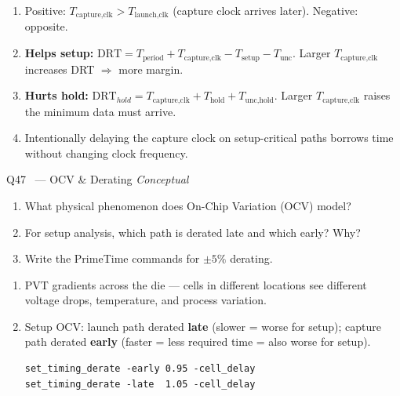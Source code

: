 \documentclass[12pt,a4paper]{article}
\newcommand{\advanced}{%
  \fbox{\textcolor{advred}{\bfseries\sffamily\small ADVANCED}}}
\begin{document}
\begin{answerbox}
\begin{enumerate}[label=\textbf{\alph*)}]
  \item Positive: $T_{\text{capture,clk}} > T_{\text{launch,clk}}$ (capture clock arrives later). Negative: opposite.
  \item \textbf{Helps setup:} $\text{DRT} = T_{\text{period}} + T_{\text{capture,clk}} - T_{\text{setup}} - T_{\text{unc}}$. Larger $T_{\text{capture,clk}}$ increases DRT $\Rightarrow$ more margin.
  \item \textbf{Hurts hold:} $\text{DRT}_{hold} = T_{\text{capture,clk}} + T_{\text{hold}} + T_{\text{unc,hold}}$. Larger $T_{\text{capture,clk}}$ raises the minimum data must arrive.
  \item Intentionally delaying the capture clock on setup-critical paths borrows time without changing clock frequency.
\end{enumerate}
\end{answerbox}

\begin{questionbox}{Q47 \advanced\ --- OCV \& Derating \hfill\textit{Conceptual}}
\begin{enumerate}[label=\textbf{\alph*)}]
  \item What physical phenomenon does On-Chip Variation (OCV) model?
  \item For setup analysis, which path is derated late and which early? Why?
  \item Write the PrimeTime commands for $\pm5\%$ derating.
\end{enumerate}
\end{questionbox}

\begin{answerbox}
\begin{enumerate}[label=\textbf{\alph*)}]
  \item PVT gradients across the die --- cells in different locations see different voltage drops, temperature, and process variation.
  \item Setup OCV: launch path derated \textbf{late} (slower = worse for setup); capture path derated \textbf{early} (faster = less required time = also worse for setup).
\begin{lstlisting}[style=tclstyle]
set_timing_derate -early 0.95 -cell_delay
set_timing_derate -late  1.05 -cell_delay
\end{lstlisting}
\end{enumerate}
\end{answerbox}
\end{document}
